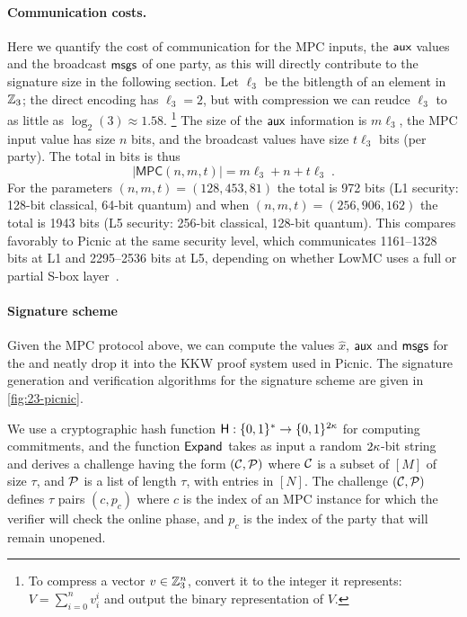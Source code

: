 \paragraph{Communication costs.}
Here we quantify the cost of communication for the MPC inputs, the $\textsf{aux}$ values and the broadcast $\textsf{msgs}$ of one party,
as this will directly contribute to the signature size in the following section. 
Let $\ell_3$ be the bitlength of an element in $\mathbb{Z}_3$; the direct encoding has
$\ell_3 = 2$, but with compression we can reudce $\ell_3$ to as little as
$\log_2(3) \approx 1.58$. \footnote{To compress a vector $v\in\mathbb{Z}_3^{n}$, convert it to the integer it represents: $V = \sum_{i=0}^n v_i^{i}$
and output the binary representation of $V$. }   The size of the
$\textsf{aux}$ information is $m\ell_3$, the MPC input value has size $n$ bits, 
and the broadcast values have size $t\ell_3$ bits (per party). 
The total in bits is thus 
\begin{equation} \label{eqn:sizeMPC}
|\textsf{MPC}(n,m,t)| = m\ell_3 + n + t\ell_3\;.
\end{equation}
For the parameters 
$(n,m,t)=(128, 453, 81)$ the total is 972 bits (L1 security: 128-bit classical, 64-bit quantum)
and when $(n,m,t) = (256, 906, 162)$ the total is 1943 bits (L5 security: 256-bit classical, 128-bit quantum).  This compares favorably to
Picnic at the same security level, which communicates 1161--1328 bits at L1
and 2295--2536 bits at L5, depending on whether LowMC uses a full or partial S-box layer~\cite{kales2020-picnic}.

\paragraph{Signature scheme}
Given the MPC protocol above, we can compute the values $\hat{x}$, $\textsf{aux}$ and
$\textsf{msgs}$ for the \ttOWF and neatly drop it into the KKW proof system used in
Picnic.  The signature generation and verification algorithms for the
\ttOWF  signature scheme are given in \cref{fig:23-picnic}.


We use a cryptographic hash function $\textsf{H}: \{0,1\}^*\to \{0,1\}^{2\kappa}$
for computing commitments, and the function $\textsf{Expand}$ takes as input a random $2\kappa$-bit string
and derives a challenge having the form $(\mathcal{C}, \mathcal{P})$ where $\mathcal{C}$ is a subset of $[M]$
of size $\tau$, and $\mathcal{P}$ is a list of length $\tau$, with entries in $[N]$. 
The challenge $(\mathcal{C}, \mathcal{P})$ defines $\tau$ pairs $(c,p_c)$ where $c$ is the
index of  an MPC instance for which the verifier will check the online phase,
and $p_c$ is the index of the party that will remain unopened. 


